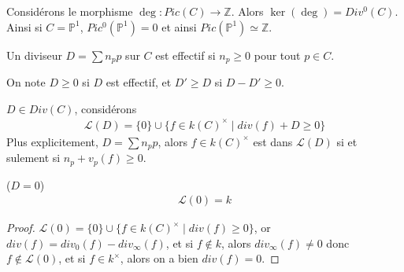             \begin{remq}
                Considérons le morphisme $\deg : Pic(C) \to \mathbb{Z}$. Alors $\ker(\deg) = Div^0(C)$. Ainsi si $C = \mathbb{P}^1$, $Pic^0(\mathbb{P}^1) = 0$ et ainsi $Pic(\mathbb{P}^1) \simeq \mathbb{Z}$.
            \end{remq}
            \begin{defi}
                Un diviseur $D = \sum n_pp$ sur $C$ est effectif si $n_p \geq 0$ pour tout $p \in C$.
            \end{defi}
            \begin{nota}
                On note $D \geq 0$ si $D$ est effectif, et $D' \geq D$ si $D - D' \geq 0$.
            \end{nota}
            \begin{nota}
                $D \in Div(C)$, considérons
                \begin{align*}
                    \mathcal{L}(D) = \{0\} \cup \{f \in k(C)^\times \mid div(f) + D \geq 0\}
                \end{align*}
                Plus explicitement, $D = \sum n_pp$, alors $f \in k(C)^\times$ est dans $\mathcal{L}(D)$ si et sulement si $n_p + v_p(f) \geq 0$.
            \end{nota}
            \begin{lemm} ($D = 0$)
                \label{d=0}
                \begin{align*}
                    \mathcal{L}(0) = k
                \end{align*}
            \end{lemm}
            \begin{proof}
                $\mathcal{L}(0) = \{0\} \cup \{f \in k(C)^\times \mid div(f) \geq 0\}$, or $div(f) = div_0(f) - div_\infty(f)$, et si $f \notin k$, alors $div_\infty(f) \neq 0$ donc $f \notin \mathcal{L}(0)$, et si $f \in k^\times$, alors on a bien $div(f) = 0$.
            \end{proof}
